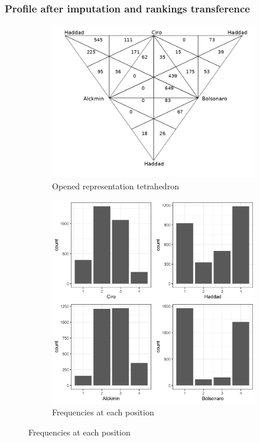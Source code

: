 \documentclass{beamer}
\begin{document}
\begin{frame}
  \frametitle{Profile after imputation and rankings transference}
\begin{figure}[!h] \centering
  \begin{subfigure}[b]{0.49\textwidth} \centering
\includegraphics[width=\textwidth]{../images/representation_tetrahedron.png}
 \caption{Opened representation tetrahedron}
 \label{fig:rep_ot}
\end{subfigure} \hfill
  \begin{subfigure}[b]{0.49\textwidth} \centering
\includegraphics[width=\textwidth]{../images/corrected1_indexes_plot.png}
 \caption{Frequencies at each position}
 \label{fig:counts}
\end{subfigure}

\end{figure}
\end{frame}
\end{document}
